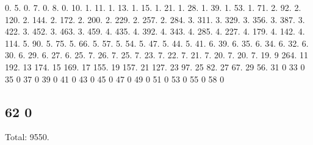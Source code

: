 0. 5. 0. 7. 0. 8. 0. 10. 1. 11. 1. 13. 1. 15. 1. 21. 1. 28. 1. 39. 1. 53. 1. 71. 2. 92. 2. 120. 2. 144. 2. 172. 2. 200. 2. 229. 2. 257. 2. 284. 3. 311. 3. 329. 3. 356. 3. 387. 3. 422. 3. 452. 3. 463. 3. 459. 4. 435. 4. 392. 4. 343. 4. 285. 4. 227. 4. 179. 4. 142. 4. 114. 5. 90. 5. 75. 5. 66. 5. 57. 5. 54. 5. 47. 5. 44. 5. 41. 6. 39. 6. 35. 6. 34. 6. 32. 6. 30. 6. 29. 6. 27. 6. 25. 7. 26. 7. 25. 7. 23. 7. 22. 7. 21. 7. 20. 7. 20. 7. 19. 9 264. 11 192. 13 174. 15 169. 17 155. 19 157. 21 127. 23 97. 25 82. 27 67. 29 56. 31 0 33 0 35 0 37 0 39 0 41 0 43 0 45 0 47 0 49 0 51 0 53 0 55 0 58 0 \subsection*{62 0 }

Total\+: 9550. 